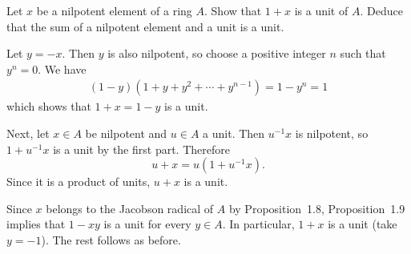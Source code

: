 \begin{exercise}
Let \(x\) be a nilpotent element of a ring \(A\).
Show that \(1 + x\) is a unit of \(A\).
Deduce that the sum of a nilpotent element and a unit is a unit.
\end{exercise}

\begin{solution}
Let \(y = -x\).
Then \(y\) is also nilpotent, so choose a positive integer \(n\) such that \(y^n = 0\).
We have
\begin{align*}
(1 - y) (1 + y + y^2 + \cdots + y^{n-1})
= 1 - y^n
= 1
\end{align*}
which shows that \(1 + x = 1 - y\) is a unit.

Next, let \(x\in A\) be nilpotent and \(u\in A\) a unit.
Then \(u^{-1} x\) is nilpotent, so \(1 + u^{-1}x\) is a unit by the first part.
Therefore
\begin{equation*}
u + x = u(1 + u^{-1} x).
\end{equation*}
Since it is a product of units, \(u + x\) is a unit.
\end{solution}

\begin{solution}
Since \(x\) belongs to the Jacobson radical of \(A\) by Proposition~1.8, Proposition~1.9 implies that \(1 - x y\) is a unit for every \(y \in A\).
In particular, \(1 + x\) is a unit (take \(y = -1\)).
The rest follows as before.
\end{solution}